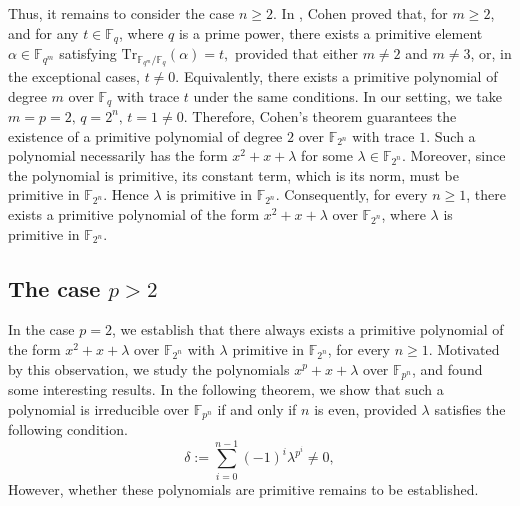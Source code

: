 \documentclass[preprint,12pt]{elsarticle}
\begin{document}
        Thus, it remains to consider the case $n\geq 2$. In {\upshape \cite[Theorem 1]{cohen1990primitive}}, Cohen proved that, for $m\geq 2$, and for any $t\in\mathbb{F}_q$, where $q$ is a prime power, there exists a primitive element $\alpha\in\mathbb{F}_{q^m}$ satisfying $\mathrm{Tr}_{\mathbb{F}_{q^m}/\mathbb{F}_q}(\alpha)=t,$ provided that either $m\neq 2$ and $m\neq 3$, or, in the exceptional cases, $t\neq 0$. Equivalently, there exists a primitive polynomial of degree $m$ over $\mathbb{F}_q$ with trace $t$ under the same conditions. In our setting, we take $m=p=2,\, q=2^n,\, t=1\neq 0.$ Therefore, Cohen's theorem guarantees the existence of a primitive polynomial of degree $2$ over $\mathbb{F}_{2^n}$ with trace $1$. Such a polynomial necessarily has the form $x^2+x+\lambda$ for some $\lambda\in\mathbb{F}_{2^n}$. Moreover, since the polynomial is primitive, its constant term, which is its norm, must be primitive in $\mathbb{F}_{2^n}$. Hence $\lambda$ is primitive in $\mathbb{F}_{2^n}$. Consequently, for every $n\geq 1$, there exists a primitive polynomial of the form $x^2+x+\lambda$ over $\mathbb{F}_{2^n}$, where $\lambda$ is primitive in $\mathbb{F}_{2^n}$.       

    \subsection{The case $p>2$}

        In the case $p=2$, we establish that there always exists a primitive polynomial of the form $x^2+x+\lambda$ over $\mathbb{F}_{2^n}$ with $\lambda$ primitive in $\mathbb{F}_{2^n}$, for every $n\geq 1$. Motivated by this observation, we study the polynomials $x^p+x+\lambda$ over $\mathbb{F}_{p^n}$, and found some interesting results. In the following theorem, we show that such a polynomial is irreducible over $\mathbb{F}_{p^n}$ if and only if $n$ is even, provided $\lambda$ satisfies the following condition.
        \begin{equation}\label{delta}
            \delta:=\sum_{i=0}^{n-1}(-1)^i\lambda^{p^i}\neq 0,
        \end{equation}
        However, whether these polynomials are primitive remains to be established.
\end{document}

